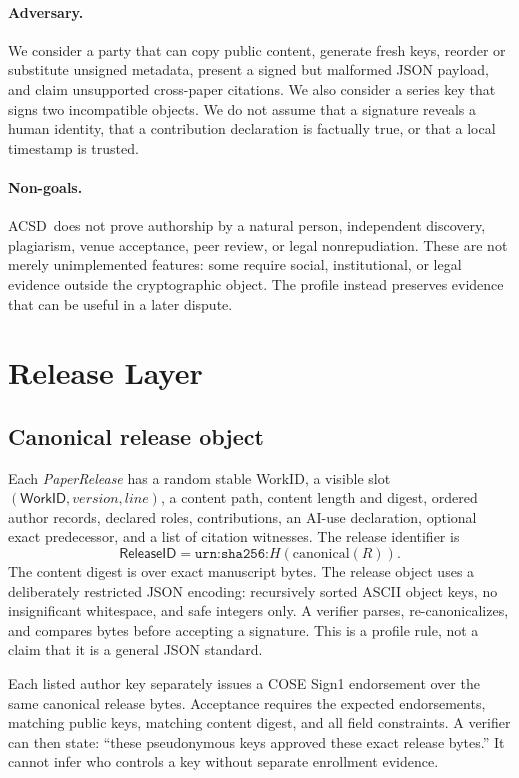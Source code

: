\documentclass[11pt]{article}
\newcommand{\workid}{\textsf{WorkID}}
\newcommand{\releaseid}{\textsf{ReleaseID}}
\newcommand{\acsd}{\textsc{ACSD}}
\begin{document}
\paragraph{Adversary.} We consider a party that can copy public content, generate fresh keys, reorder or substitute unsigned metadata, present a signed but malformed JSON payload, and claim unsupported cross-paper citations. We also consider a series key that signs two incompatible objects. We do not assume that a signature reveals a human identity, that a contribution declaration is factually true, or that a local timestamp is trusted.

\paragraph{Non-goals.} \acsd\ does not prove authorship by a natural person, independent discovery, plagiarism, venue acceptance, peer review, or legal nonrepudiation. These are not merely unimplemented features: some require social, institutional, or legal evidence outside the cryptographic object. The profile instead preserves evidence that can be useful in a later dispute.

\section{Release Layer}

\subsection{Canonical release object}

Each \emph{PaperRelease} has a random stable \workid, a visible slot $(\workid,\textit{version},\textit{line})$, a content path, content length and digest, ordered author records, declared roles, contributions, an AI-use declaration, optional exact predecessor, and a list of citation witnesses. The release identifier is
\[
  \releaseid = \texttt{urn:sha256:}H(\mathrm{canonical}(R)).
\]
The content digest is over exact manuscript bytes. The release object uses a deliberately restricted JSON encoding: recursively sorted ASCII object keys, no insignificant whitespace, and safe integers only. A verifier parses, re-canonicalizes, and compares bytes before accepting a signature. This is a profile rule, not a claim that it is a general JSON standard.

Each listed author key separately issues a COSE Sign1 endorsement over the same canonical release bytes. Acceptance requires the expected endorsements, matching public keys, matching content digest, and all field constraints. A verifier can then state: ``these pseudonymous keys approved these exact release bytes.'' It cannot infer who controls a key without separate enrollment evidence.
\end{document}
